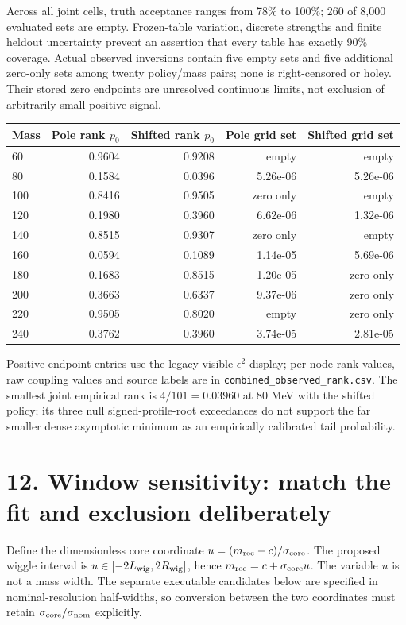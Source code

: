 \documentclass[10pt]{article}
\begin{document}
Across all joint cells, truth acceptance ranges from 78\% to 100\%; 260 of 8,000 evaluated sets are empty. Frozen-table variation, discrete strengths and finite heldout uncertainty prevent an assertion that every table has exactly 90\% coverage. Actual observed inversions contain five empty sets and five additional zero-only sets among twenty policy/mass pairs; none is right-censored or holey. Their stored zero endpoints are unresolved continuous limits, not exclusion of arbitrarily small positive signal.
\begin{center}\small\begin{tabular}{lrrrr}\toprule
Mass & Pole rank $p_0$ & Shifted rank $p_0$ & Pole grid set & Shifted grid set\\\midrule
60 & 0.9604 & 0.9208 & empty & empty\\
80 & 0.1584 & 0.0396 & 5.26e-06 & 5.26e-06\\
100 & 0.8416 & 0.9505 & zero only & empty\\
120 & 0.1980 & 0.3960 & 6.62e-06 & 1.32e-06\\
140 & 0.8515 & 0.9307 & zero only & empty\\
160 & 0.0594 & 0.1089 & 1.14e-05 & 5.69e-06\\
180 & 0.1683 & 0.8515 & 1.20e-05 & zero only\\
200 & 0.3663 & 0.6337 & 9.37e-06 & zero only\\
220 & 0.9505 & 0.8020 & empty & zero only\\
240 & 0.3762 & 0.3960 & 3.74e-05 & 2.81e-05\\
\bottomrule\end{tabular}\end{center}Positive endpoint entries use the legacy visible $\epsilon^2$ display; per-node rank values, raw coupling values and source labels are in \texttt{combined\_observed\_rank.csv}. The smallest joint empirical rank is $4/101=0.03960$ at 80 MeV with the shifted policy; its three null signed-profile-root exceedances do not support the far smaller dense asymptotic minimum as an empirically calibrated tail probability.\clearpage\section*{12. Window sensitivity: match the fit and exclusion deliberately}

Define the dimensionless core coordinate $u=(m_{\rm rec}-c)/\sigma_{\rm core}$. The proposed wiggle interval is $u\in[-2L_{\rm wig},2R_{\rm wig}]$, hence $m_{\rm rec}=c+\sigma_{\rm core}u$. The variable $u$ is not a mass width. The separate executable candidates below are specified in nominal-resolution half-widths, so conversion between the two coordinates must retain $\sigma_{\rm core}/\sigma_{\rm nom}$ explicitly.
\end{document}
